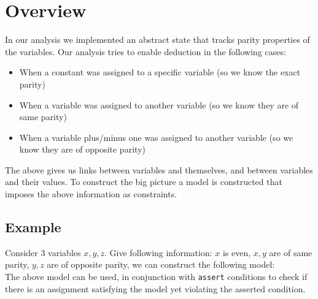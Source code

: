 \section*{Overview}
In our analysis we implemented an abstract state that tracks parity properties of the variables. Our analysis tries to enable deduction in the following cases:
\begin{itemize}
	\item When a constant was assigned to a specific variable (so we know the exact parity)
	\item When a variable was assigned to another variable (so we know they are of same parity)
	\item When a variable plus/minus one was assigned to another variable (so we know they are of opposite parity)
\end{itemize}
The above gives us links between variables and themselves, and between variables and their values. To construct the big picture a model is constructed that imposes the above information as constraints.
\subsection*{Example}
Consider 3 variables $x,y,z$. Give following information: $x$ is even, $x,y$ are of same parity, $y,z$ are of opposite parity, we can construct the following model:
\begin{equation*}
	[x_{even} \wedge (x_{even} \rightarrow y_{even}) \wedge (y_{even} \rightarrow \neg z_{even})]
\end{equation*}
The above model can be used, in conjunction with \texttt{assert} conditions to check if there is an assignment satisfying the model yet violating the asserted condition.